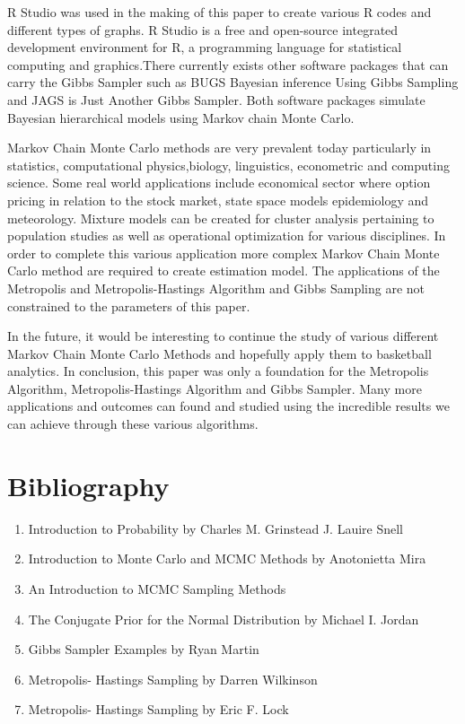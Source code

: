 \documentclass[11pt,a4paper]{article}
\theoremstyle{plain}
\begin{document}
R Studio was used in the making of this paper to create various R codes and different types of  graphs. R Studio is a free and open-source integrated development environment for R, a programming language for statistical computing and graphics.There currently exists other software packages that can carry the Gibbs Sampler such as BUGS  Bayesian inference Using Gibbs Sampling and  JAGS is Just Another Gibbs Sampler. Both software packages simulate Bayesian hierarchical models using Markov chain Monte Carlo.

Markov Chain Monte Carlo methods are very prevalent today particularly in statistics, computational physics,biology, linguistics, econometric and computing science.  Some real world applications include economical sector where option pricing in relation to the stock market, state space models epidemiology and meteorology. Mixture models can be created for cluster analysis pertaining to population studies as well as operational optimization for various disciplines. In order to complete this various application more complex Markov Chain Monte Carlo method are required to create estimation model. The applications of the Metropolis and Metropolis-Hastings Algorithm and Gibbs Sampling  are not constrained to the parameters of this paper. 

In the future, it would be interesting to continue the study of various different Markov Chain Monte Carlo Methods and hopefully apply them to basketball analytics. In conclusion, this paper was only a foundation for the Metropolis Algorithm, Metropolis-Hastings Algorithm and Gibbs Sampler. Many more applications and outcomes can found and studied using the incredible results we can achieve through these various algorithms.

\newpage

\section{Bibliography}
\begin{enumerate}
  \item Introduction to Probability by Charles M. Grinstead J. Lauire Snell
\item{Introduction to Monte Carlo and MCMC Methods by Anotonietta Mira}
\item An Introduction to MCMC Sampling Methods 
\item The Conjugate Prior for the Normal Distribution by Michael I. Jordan
\item Gibbs Sampler Examples by Ryan Martin
\item Metropolis- Hastings Sampling by Darren Wilkinson
\item Metropolis- Hastings Sampling by Eric F. Lock
\end{enumerate}
\end{document}
